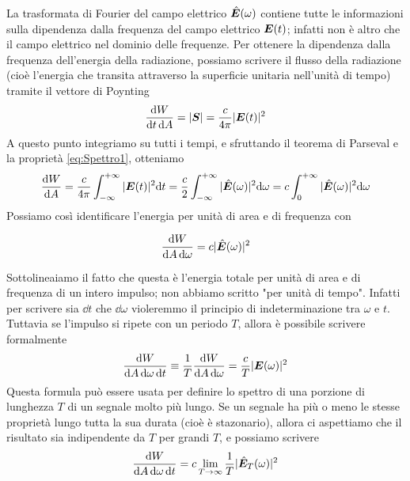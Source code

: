 La trasformata di Fourier del campo elettrico $\hat{\V{E}}(\omega)$ contiene tutte le informazioni sulla dipendenza dalla frequenza del campo elettrico $\V{E}(t)$; infatti non è altro che il campo elettrico nel dominio delle frequenze. Per ottenere la dipendenza dalla frequenza dell'energia della radiazione, possiamo scrivere il flusso della radiazione (cioè l'energia che transita attraverso la superficie unitaria nell'unità di tempo) tramite il vettore di Poynting
\begin{equation}
\dfrac{\dd W}{\dd t \, \dd A} =  |\V{S}| = \dfrac{c}{4 \pi} |\V{E}(t)|^2
\end{equation}
A questo punto integriamo su tutti i tempi, e sfruttando il teorema di Parseval e la proprietà \ref{eq:Spettro1}, otteniamo
\begin{equation}
\der{W}{A} = \dfrac{c}{4\pi} \int_{-\infty}^{+\infty} |\V{E}(t)|^2 \dd t = \dfrac{c}{2} \int_{-\infty}^{+\infty} |\hat{\V{E}}(\omega)|^2 \dd \omega = c \int_{0}^{+\infty} |\hat{\V{E}}(\omega)|^2 \dd \omega
\end{equation}
Possiamo così identificare l'energia per unità di area e di frequenza con
\begin{EQ}
\begin{equation}
\dfrac{\dd W}{\dd A \, \dd \omega} = c |\hat{\V{E}}(\omega)|^2
\end{equation}
\end{EQ}
Sottolineaiamo il fatto che questa è l'energia totale per unità di area e di frequenza di un intero impulso; non abbiamo scritto "per unità di tempo". Infatti per scrivere sia $\dd t$ che $\dd\omega$ violeremmo il principio di indeterminazione tra $\omega$ e $t$. Tuttavia se l'impulso si ripete con un periodo $T$, allora è possibile scrivere formalmente 
\begin{equation}
\dfrac{\dd W}{\dd A \, \dd \omega \, \dd t} \equiv \inv{T} \dfrac{\dd W}{\dd A \, \dd \omega} = \dfrac{c}{T} |\V{E}(\omega)|^2
\end{equation}
Questa formula può essere usata per definire lo spettro di una porzione di lunghezza $T$ di un segnale molto più lungo. Se un segnale ha più o meno le stesse proprietà lungo tutta la sua durata (cioè è stazonario), allora ci aspettiamo che il risultato sia indipendente da $T$ per grandi $T$, e possiamo scrivere
\begin{equation}
\dfrac{\dd W}{\dd A \, \dd \omega \, \dd t}  = c \lim_{T\to\infty} \inv{T} |\hat{\V{E}}_T(\omega)|^2
\end{equation}
